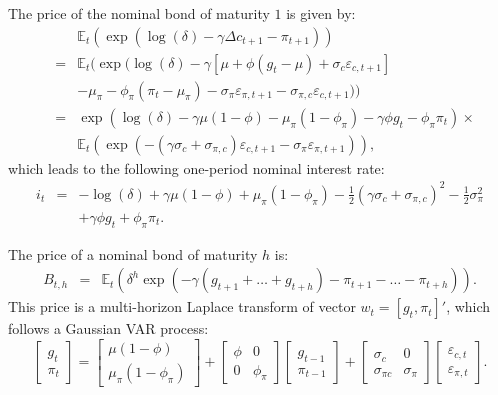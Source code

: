 \documentclass[
  12pt,
]{book}
\theoremstyle{definition}
\theoremstyle{definition}
\theoremstyle{definition}
\theoremstyle{definition}
\theoremstyle{remark}
\begin{document}
The price of the nominal bond of maturity \(1\) is given by:
\begin{eqnarray*}
&&\mathbb{E}_t(\exp(\log(\delta) -\gamma \Delta c_{t+1}-\pi_{t+1}))\\
&=& \mathbb{E}_t(\exp(\log(\delta)-\gamma [\mu + \phi (g_t - \mu) + \sigma_c \varepsilon_{c,t+1}] \\
&& - \mu_\pi - \phi_\pi (\pi_{t} - \mu_\pi) - \sigma_\pi \varepsilon_{\pi,t+1} - \sigma_{\pi,c}\varepsilon_{c,t+1}))\\
&=& \exp(\log(\delta)-\gamma \mu (1-\phi) - \mu_\pi(1-\phi_\pi)-\gamma \phi g_t - \phi_\pi \pi_{t}) \times \\
&& \mathbb{E}_t(\exp( - (\gamma \sigma_c+\sigma_{\pi,c}) \varepsilon_{c,t+1}  - \sigma_\pi \varepsilon_{\pi,t+1})),
\end{eqnarray*}
which leads to the following one-period nominal interest rate:
\begin{eqnarray}
i_t &=& - \log(\delta) +\gamma \mu (1-\phi) + \mu_\pi(1-\phi_\pi) - \frac{1}{2}(\gamma \sigma_c+\sigma_{\pi,c})^2 - \frac{1}{2}\sigma_\pi^2 \nonumber\\ 
&& + \gamma \phi g_t + \phi_\pi \pi_{t}. \label{eq:nominalCCAPM}
\end{eqnarray}

The price of a nominal bond of maturity \(h\) is:
\begin{eqnarray*}
B_{t,h} &=& \mathbb{E}_t(\delta^{h}\exp(-\gamma (g_{t+1}+\dots+g_{t+h}) - \pi_{t+1}-\dots-\pi_{t+h})).
\end{eqnarray*}
This price is a multi-horizon Laplace transform of vector \(w_t = [g_t,\pi_t]'\), which follows a Gaussian VAR process:
\[
\left[\begin{array}{c}g_t\\
\pi_t\end{array}\right] = 
\left[\begin{array}{c} \mu (1-\phi)\\
\mu_\pi(1-\phi_\pi)\end{array}\right]+
\left[\begin{array}{cc} \phi & 0\\
0 & \phi_\pi\end{array}\right]\left[\begin{array}{c}g_{t-1}\\
\pi_{t-1}\end{array}\right]+
\left[\begin{array}{cc} \sigma_c & 0\\
\sigma_{\pi c} & \sigma_\pi\end{array}\right]\left[\begin{array}{c}\varepsilon_{c,t}\\
\varepsilon_{\pi,t}\end{array}\right].
\]
\end{document}
